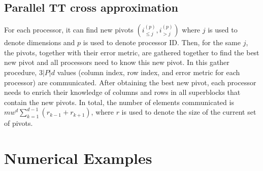 \documentclass[11pt,a4paper,review]{siamart220329}
\begin{document}
\subsection{Parallel TT cross approximation}
For each processor, it can find new pivots $(i_{\le j}^{(p)},i_{>j}^{(p)})$ where $j$ is used to denote dimensions and $p$ is used to denote processor ID. Then, for the same $j$, the pivots, together with their error metric, are gathered together to find the best new pivot and all processors need to know this new pivot. In this gather procedure, $3|P|d$ values (column index, row index, and error metric for each processor) are communicated. After obtaining the best new pivot, each processor needs to enrich their knowledge of columns and rows in all superblocks that contain the new pivots. In total, the number of elements communicated is $mw^d\sum_{k=1}^{d-1}(r_{k-1}+r_{k+1})$, where $r$ is used to denote the size of the current set of pivots.

\section{Numerical Examples}
\label{sec:NumericalExamples}

\printbibliography
\end{document}
